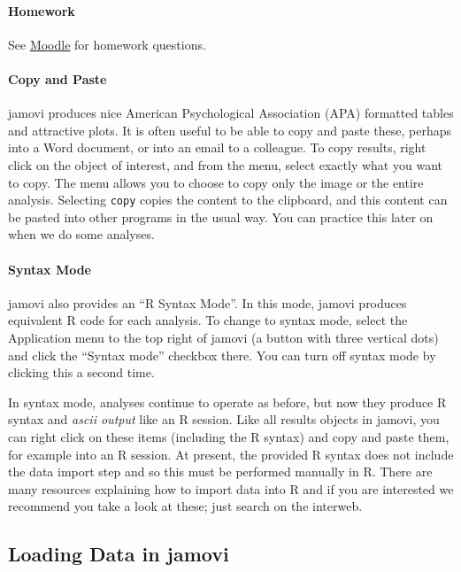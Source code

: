 \documentclass[
]{book}
\begin{document}
\hypertarget{homework}{%
\paragraph{Homework}\label{homework}}

See \href{https://moodle.stfx.ca/course/view.php?id=29319}{Moodle} for homework questions.

\hypertarget{copy-and-paste}{%
\paragraph{Copy and Paste}\label{copy-and-paste}}

jamovi produces nice American Psychological Association (APA) formatted tables and attractive plots. It is often useful to be able to copy and paste these, perhaps into a Word document, or into an email to a colleague. To copy results, right click on the object of interest, and from the menu, select exactly what you want to copy. The menu allows you to choose to copy only the image or the entire analysis. Selecting \texttt{copy} copies the content to the clipboard, and this content can be pasted into other programs in the usual way. You can practice this later on when we do some analyses.

\hypertarget{syntax-mode}{%
\paragraph{Syntax Mode}\label{syntax-mode}}

jamovi also provides an ``R Syntax Mode''. In this mode, jamovi produces equivalent R code for each analysis. To change to syntax mode, select the Application menu to the top right of jamovi (a button with three vertical dots) and click the ``Syntax mode'' checkbox there. You can turn off syntax mode by clicking this a second time.

In syntax mode, analyses continue to operate as before, but now they produce R syntax and \emph{ascii output} like an R session. Like all results objects in jamovi, you can right click on these items (including the R syntax) and copy and paste them, for example into an R session. At present, the provided R syntax does not include the data import step and so this must be performed manually in R. There are many resources explaining how to import data into R and if you are interested we recommend you take a look at these; just search on the interweb.

\hypertarget{loading-data-in-jamovi}{%
\subsection{Loading Data in jamovi}\label{loading-data-in-jamovi}}
\end{document}
